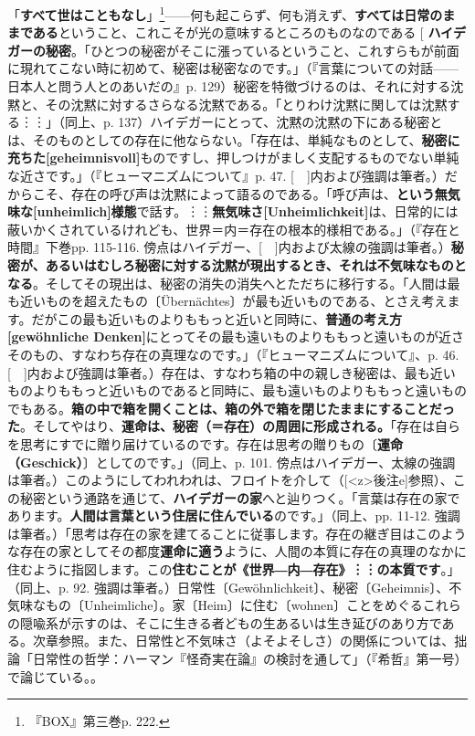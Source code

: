 \documentclass[9pt,b5j,twoside,twocolumn]{utarticle}
\makeatletter
\def\yakuchu{%
\@ifnextchar[\@xfootnote %
{\stepcounter{yakuchu}%
\protected@xdef\@thefnmark{\theyakuchu}%
\@footnotemark\@footnotetext}}
\makeatother
\begin{document}
「\textbf{すべて世はこともなし}」\footnote{『BOX』第三巻p. 222.}------何も起こらず、何も消えず、\textbf{すべては日常のままである}ということ、これこそが光の意味するところのものなのである
\yakuchu{\textbf{ハイデガーの秘密}。「ひとつの秘密がそこに漲っているということ、これすらもが前面に現れてこない時に初めて、秘密は秘密なのです。」（『言葉についての対話------日本人と問う人とのあいだの』p. 129）秘密を特徴づけるのは、それに対する沈黙と、その沈黙に対するさらなる沈黙である。「とりわけ沈黙に関しては沈黙する︙︙」（同上、p. 137）ハイデガーにとって、沈黙の沈黙の下にある秘密とは、そのものとしての存在に他ならない。「存在は、単純なものとして、\textbf{秘密に充ちた[geheimnisvoll]}ものですし、押しつけがましく支配するものでない単純な近さです。」（『ヒューマニズムについて』p. 47. [　]内および強調は筆者。）だからこそ、存在の呼び声は沈黙によって語るのである。「呼び声は、\textbf{という無気味な[unheimlich]様態}で話す。︙︙\textbf{無気味さ[Unheimlichkeit]}は、日常的には蔽いかくされているけれども、世界＝内＝存在の根本的様相である。」（『存在と時間』下巻pp. 115-116. 傍点はハイデガー、[　]内および太線の強調は筆者。）\textbf{秘密が、あるいはむしろ秘密に対する沈黙が現出するとき、それは不気味なものとなる}。そしてその現出は、秘密の消失の消失へとただちに移行する。「人間は最も近いものを超えたもの〔\"Ubern\"achtes〕が最も近いものである、とさえ考えます。だがこの最も近いものよりももっと近いと同時に、\textbf{普通の考え方[gewöhnliche Denken]}にとってその最も遠いものよりももっと遠いものが近さそのもの、すなわち存在の真理なのです。」（『ヒューマニズムについて』、p. 46. [　]内および強調は筆者。）存在は、すなわち箱の中の親しき秘密は、最も近いものよりももっと近いものであると同時に、最も遠いものよりももっと遠いものでもある。\textbf{箱の中で箱を開くことは、箱の外で箱を閉じたままにすることだった}。そしてやはり、\textbf{運命は、秘密（＝存在）の周囲に形成される。}「存在は自らを思考にすでに贈り届けているのです。存在は思考の贈りもの〔\textbf{運命（Geschick）}〕としてのです。」（同上、p. 101. 傍点はハイデガー、太線の強調は筆者。）このようにしてわれわれは、フロイトを介して（[\pbox<z>{後注e}]参照）、この秘密という通路を通じて、\textbf{ハイデガーの家}へと辿りつく。「言葉は存在の家であります。\textbf{人間は言葉という住居に住んでいる}のです。」（同上、pp. 11-12. 強調は筆者。）「思考は存在の家を建てることに従事します。存在の継ぎ目はこのような存在の家としてその都度\textbf{運命に適う}ように、人間の本質に存在の真理のなかに住むように指図します。この\textbf{住むことが《世界―内―存在》︙︙の本質です}。」（同上、p. 92. 強調は筆者。）日常性〔Gew\"ohnlichkeit〕、秘密〔Geheimnis〕、不気味なもの〔Unheimliche〕。家〔Heim〕に住む〔wohnen〕ことをめぐるこれらの隠喩系が示すのは、そこに生きる者どもの生あるいは生き延びのあり方である。次章参照。また、日常性と不気味さ（よそよそしさ）の関係については、拙論「日常性の哲学：ハーマン『怪奇実在論』の検討を通して」（『希哲』第一号）で論じている。}。
\end{document}

